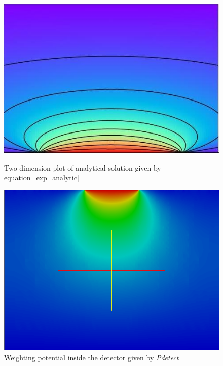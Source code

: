 \documentclass[11pt]{article}
\begin{document}
			\begin{figure}[H]
				\begin{minipage}[b]{.46\linewidth}
					\center
					\includegraphics[scale=0.5]{images/boundary_conditions/plot_analytic.jpg}
					\caption{Two dimension plot of analytical solution given by equation~\ref{exp_analytic}}
					\label{fig:plot_analytic}
				\end{minipage} \hfill
				\begin{minipage}[b]{.46\linewidth}
				\center
					\includegraphics[scale=0.3]{images/boundary_conditions/w_semi_free_conditions.png}
					\caption{Weighting potential inside the detector given by \textit{Pdetect}}
					\label{fig:w_semi_free_conditions}
					\end{minipage}
			\end{figure}
\end{document}
